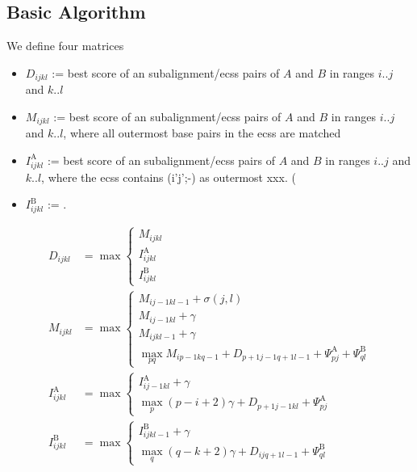 \documentclass{article}
\newcommand{\Gmat}[4]{D_{#1 #2 #3 #4}}
\newcommand{\Mmat}[4]{M_{#1 #2 #3 #4}}
\newcommand{\IAmat}[4]{I^\textrm{A}_{#1 #2 #3 #4}}
\newcommand{\IBmat}[4]{I^\textrm{B}_{#1 #2 #3 #4}}
\newcommand{\PsiA}[1]{\Psi^\textrm{A}_{#1}}
\newcommand{\PsiB}[1]{\Psi^\textrm{B}_{#1}}
\begin{document}
\subsection{Basic Algorithm}
We define four matrices
\begin{itemize}
\item $\Gmat{i}{j}{k}{l}$ := best score of an subalignment/ecss pairs of $A$ and $B$
  in ranges ${i..j}$ and ${k..l}$
\item $\Mmat{i}{j}{k}{l}$ := best score of an subalignment/ecss pairs
  of $A$ and $B$ in ranges ${i..j}$ and ${k..l}$, where all outermost
  base pairs in the ecss are matched
\item $\IAmat{i}{j}{k}{l}$ := best score of an subalignment/ecss pairs
  of $A$ and $B$ in ranges ${i..j}$ and ${k..l}$, where the ecss
  contains (i'j';-) as outermost xxx. (
\item $\IBmat{i}{j}{k}{l}$ := .
\end{itemize}

\begin{align}
  \Gmat{i}{j}{k}{l} &= \max
  \begin{cases}
    \Mmat{i}{j}{k}{l}\\
    \IAmat{i}{j}{k}{l}\\
    \IBmat{i}{j}{k}{l}
  \end{cases}\\
  \Mmat{i}{j}{k}{l} &= \max
  \begin{cases}
    \Mmat{i}{j-1}{k}{l-1} + \sigma(j,l)\\
    \Mmat{i}{j-1}{k}{l} + \gamma\\
    \Mmat{i}{j}{k}{l-1} + \gamma\\
    \max_{pq} \Mmat{i}{p-1}{k}{q-1} + \Gmat{p+1}{j-1}{q+1}{l-1} + \PsiA{pj} + \PsiB{ql}
  \end{cases}\\
  \IAmat{i}{j}{k}{l} &= \max
  \begin{cases}
    \IAmat{i}{j-1}{k}{l} + \gamma\\
    \max_p (p-i+2)\gamma + \Gmat{p+1}{j-1}{k}{l} +  \PsiA{pj}
  \end{cases}\\
  \IBmat{i}{j}{k}{l} &= \max
  \begin{cases}
    \IBmat{i}{j}{k}{l-1} + \gamma\\
    \max_q (q-k+2)\gamma + \Gmat{i}{j}{q+1}{l-1} +  \PsiB{ql}   
  \end{cases}
\end{align}
\end{document}

